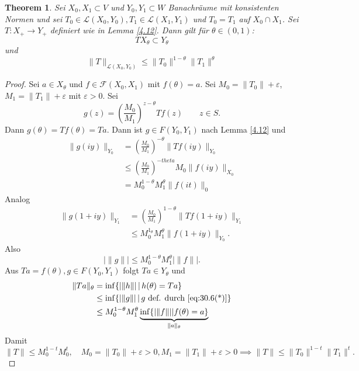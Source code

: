 \documentclass[
paper=a4,
bibtotocnumbered,
liststotocnumbered,
tablecaptionabove,
pointlessnumbers,
twoside,
openright,
10pt
]
{report}
\newtheorem{thm}{Theorem}[chapter]
\theoremstyle{definition}
\numberwithin{equation}{chapter}
\begin{document}
\begin{thm}\label{4.13}
Sei $X_0, X_1\subset V$ und $Y_0, Y_1 \subset W$ Banachräume mit konsistenten Normen und sei $T_0 \in \mathcal L(X_0, Y_0), T_1 \in \mathcal L(X_1, Y_1)$ und $T_0 = T_1$ auf $X_0 \cap X_1$. Sei $T: X_+ \to Y_+$ definiert wie in Lemma \ref{4.12}. Dann gilt für $\theta \in (0,1)$:
\begin{equation}
T X_\theta \subset Y_\theta
\end{equation}
und
\begin{equation}
\| T\|_{\mathcal L(X_0, Y_0)} \le \| T_0\|^{1-\theta} \| T_1\|^\theta
\end{equation}
\end{thm}
\begin{proof}
Sei $a\in X_\theta$ und $f\in \mathcal F(X_0, X_1)$ mit $f(\theta)=a$. Sei $M_0 = \| T_0\| + \varepsilon$, $M_1 = \| T_1\| + \varepsilon$ mit $\varepsilon>0$. Sei
\begin{equation}\label{eq:30.6(*)}
g(z) = \left (\frac{M_0}{M_1} \right )^{z-\theta} Tf(z) \qquad z\in S.
\end{equation}
Dann $g(\theta)= Tf(\theta)=Ta$.  Dann ist $g\in F(Y_0, Y_1)$ nach Lemma \ref{4.12} und 
\begin{align*}
\| g(iy)\|_{Y_0} &= \left (\frac{M_0}{M_1} \right )^{-\theta} \| T f(iy) \|_{Y_0}\\
&\le \left ( \frac{M_0}{M_1} \right )^{-theta} M_0 \| f(iy)\|_{X_0} \\
&= M_0^{1-\theta} M_1^\theta \| f(it)\|_0
\end{align*}
Analog
\begin{align*}
\| g(1+iy) \|_{Y_1} &= \left ( \frac{M_0}{M_1} \right )^{1-\theta} \| Tf(1+iy) \|_{Y_1}\\
&\le M_0^{1_\theta} M_1^\theta \| f(1+iy)\|_{Y_0}.
\end{align*}
Also
\begin{equation}
|\| g\| | \le M_0^{1-\theta} M_1^{\theta} |\| f\| |.
\end{equation}
Aus $Ta = f(\theta), g\in F(Y_0, Y_1)$ folgt $Ta\in Y_{\theta}$ und
\begin{align*}
\| Ta\|_\theta &= \inf\{ |\| h\| |\, | \, h(\theta) = Ta\}\\
&\le \inf \{ | \| g\| | \, | \, g \text{ def. durch } \eqref{eq:30.6(*)}\}\\
&\le M_0^{1-\theta} M_1^\theta \underbrace{\inf\{ |\| f\| | | f(\theta) = a\}}_{\| a\|_\theta}
\end{align*}
Damit
\begin{equation}
\| T\| \le M_0^{1-t} M_0^t, \quad M_0 = \| T_0\|+ \varepsilon >0, M_1 = \| T_1\|+\varepsilon >0 \implies \| T\| \le \| T_0 \|^{1-t} \| T_1\|^t.
\end{equation}
\end{proof}
\end{document}
